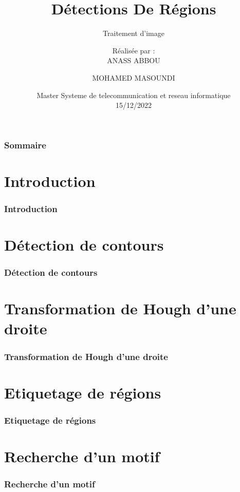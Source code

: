 \documentclass[11pt]{beamer}
\title[]{Détections De Régions}
\subtitle{Traitement d'image}
\author[FPBM]{Réalisée par :\\ANASS ABBOU \and MOHAMED MASOUNDI}
\institute[FPBM]{Faculté Polydisciplinaire Béni Mellal\\ \smallskip \textit{anass.abbou1@usms.ac.ma}}
\date[15/12/2022]{Master Systeme de telecommunication et reseau informatique\\ 15/12/2022}
\begin{document}
\begin{frame}
	\titlepage
\end{frame}
\begin{frame}
	\frametitle{Sommaire}
	\tableofcontents
\end{frame}
\section{Introduction}
\begin{frame}
	\frametitle{Introduction}
\end{frame}
\section{Détection de contours}

\begin{frame}
	\frametitle{Détection de contours}
\end{frame}
\section{Transformation de Hough d’une droite}

\begin{frame}
	\frametitle{Transformation de Hough d’une droite}
\end{frame}
\section{Etiquetage de régions}

\begin{frame}
	\frametitle{Etiquetage de régions}
\end{frame}

\section{Recherche d’un motif}

\begin{frame}
	\frametitle{Recherche d’un motif}
\end{frame}
\end{document}

